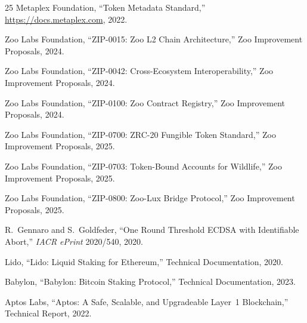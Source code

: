 \documentclass[11pt,letterpaper]{article}
\begin{document}
\begin{thebibliography}{25}
Metaplex Foundation, ``Token Metadata Standard,'' \url{https://docs.metaplex.com}, 2022.

Zoo Labs Foundation, ``ZIP-0015: Zoo L2 Chain Architecture,'' Zoo Improvement Proposals, 2024.

Zoo Labs Foundation, ``ZIP-0042: Cross-Ecosystem Interoperability,'' Zoo Improvement Proposals, 2024.

Zoo Labs Foundation, ``ZIP-0100: Zoo Contract Registry,'' Zoo Improvement Proposals, 2024.

Zoo Labs Foundation, ``ZIP-0700: ZRC-20 Fungible Token Standard,'' Zoo Improvement Proposals, 2025.

Zoo Labs Foundation, ``ZIP-0703: Token-Bound Accounts for Wildlife,'' Zoo Improvement Proposals, 2025.

Zoo Labs Foundation, ``ZIP-0800: Zoo-Lux Bridge Protocol,'' Zoo Improvement Proposals, 2025.

R.~Gennaro and S.~Goldfeder, ``One Round Threshold ECDSA with Identifiable Abort,'' \textit{IACR ePrint} 2020/540, 2020.

Lido, ``Lido: Liquid Staking for Ethereum,'' Technical Documentation, 2020.

Babylon, ``Babylon: Bitcoin Staking Protocol,'' Technical Documentation, 2023.

Aptos Labs, ``Aptos: A Safe, Scalable, and Upgradeable Layer~1 Blockchain,'' Technical Report, 2022.

\end{thebibliography}
\end{document}
